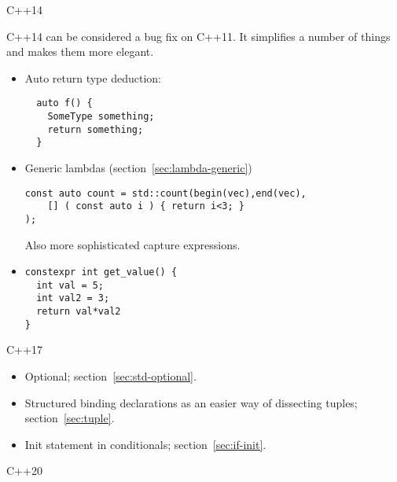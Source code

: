 
 {C++14}

C++14 can be considered a bug fix on C++11.
It simplifies a number of things and makes them more elegant.

\begin{itemize}
\item
  Auto return type deduction:
\begin{lstlisting}
  auto f() {
    SomeType something;
    return something;
  }
\end{lstlisting}

\item Generic lambdas (section~\ref{sec:lambda-generic})
\begin{lstlisting}
const auto count = std::count(begin(vec),end(vec),
    [] ( const auto i ) { return i<3; }    
);
\end{lstlisting}
Also more sophisticated capture expressions.

\item {}
\begin{lstlisting}
constexpr int get_value() {
  int val = 5;
  int val2 = 3;
  return val*val2
}
\end{lstlisting}
\end{itemize}


 {C++17}

\begin{itemize}
\item  Optional; section~\ref{sec:std-optional}.
\item Structured binding declarations as an easier way of dissecting
  tuples; section~\ref{sec:tuple}.
\item Init statement in conditionals; section~\ref{sec:if-init}.
\end{itemize}


 {C++20}
\label{sec:cpp20}


